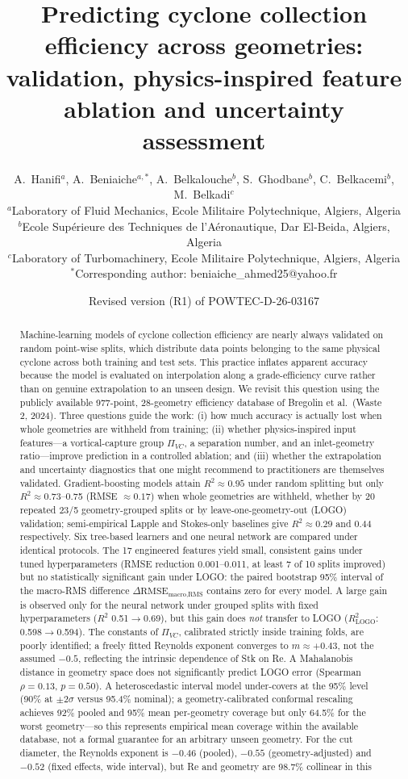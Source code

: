 \documentclass[12pt]{article}
\title{Predicting cyclone collection efficiency across geometries: \\
validation, physics-inspired feature ablation and uncertainty assessment}
\author{A.~Hanifi$^{a}$, A.~Beniaiche$^{a,*}$, A.~Belkalouche$^{b}$, S.~Ghodbane$^{b}$, C.~Belkacemi$^{b}$, M.~Belkadi$^{c}$\\[2pt]
{\small $^a$Laboratory of Fluid Mechanics, Ecole Militaire Polytechnique, Algiers, Algeria}\\
{\small $^b$Ecole Sup\'erieure des Techniques de l'A\'eronautique, Dar El-Beida, Algiers, Algeria}\\
{\small $^c$Laboratory of Turbomachinery, Ecole Militaire Polytechnique, Algiers, Algeria}\\
{\small $^*$Corresponding author: beniaiche\_ahmed25@yahoo.fr}}
\date{Revised version (R1) of POWTEC-D-26-03167}
\newcommand{\PiVC}{\Pi_{VC}}
\begin{document}
\maketitle

\begin{abstract}
Machine-learning models of cyclone collection efficiency are nearly always validated on random point-wise splits, which distribute data points belonging to the same physical cyclone across both training and test sets. This practice inflates apparent accuracy because the model is evaluated on interpolation along a grade-efficiency curve rather than on genuine extrapolation to an unseen design. We revisit this question using the publicly available 977-point, 28-geometry efficiency database of Bregolin et al.\ (Waste 2, 2024). Three questions guide the work: (i) how much accuracy is actually lost when whole geometries are withheld from training; (ii) whether physics-inspired input features---a vortical-capture group $\PiVC$, a separation number, and an inlet-geometry ratio---improve prediction in a controlled ablation; and (iii) whether the extrapolation and uncertainty diagnostics that one might recommend to practitioners are themselves validated. Gradient-boosting models attain $R^2\approx0.95$ under random splitting but only $R^2\approx0.73$--0.75 (RMSE $\approx 0.17$) when whole geometries are withheld, whether by 20 repeated 23/5 geometry-grouped splits or by leave-one-geometry-out (LOGO) validation; semi-empirical Lapple and Stokes-only baselines give $R^2\approx0.29$ and 0.44 respectively. Six tree-based learners and one neural network are compared under identical protocols. The 17 engineered features yield small, consistent gains under tuned hyperparameters (RMSE reduction 0.001--0.011, at least 7 of 10 splits improved) but no statistically significant gain under LOGO: the paired bootstrap 95\% interval of the macro-RMS difference $\Delta\text{RMSE}_{\text{macro,RMS}}$ contains zero for every model. A large gain is observed only for the neural network under grouped splits with fixed hyperparameters ($R^2$ 0.51$\to$0.69), but this gain does \emph{not} transfer to LOGO ($R^2_{\text{LOGO}}$: 0.598$\to$0.594). The constants of $\PiVC$, calibrated strictly inside training folds, are poorly identified; a freely fitted Reynolds exponent converges to $m\approx+0.43$, not the assumed $-0.5$, reflecting the intrinsic dependence of Stk on Re. A Mahalanobis distance in geometry space does not significantly predict LOGO error (Spearman $\rho=0.13$, $p=0.50$). A heteroscedastic interval model under-covers at the 95\% level (90\% at $\pm2\sigma$ versus 95.4\% nominal); a geometry-calibrated conformal rescaling achieves 92\% pooled and 95\% mean per-geometry coverage but only 64.5\% for the worst geometry---so this represents empirical mean coverage within the available database, not a formal guarantee for an arbitrary unseen geometry. For the cut diameter, the Reynolds exponent is $-0.46$ (pooled), $-0.55$ (geometry-adjusted) and $-0.52$ (fixed effects, wide interval), but Re and geometry are 98.7\% collinear in this 
\end{abstract}
\end{document}
